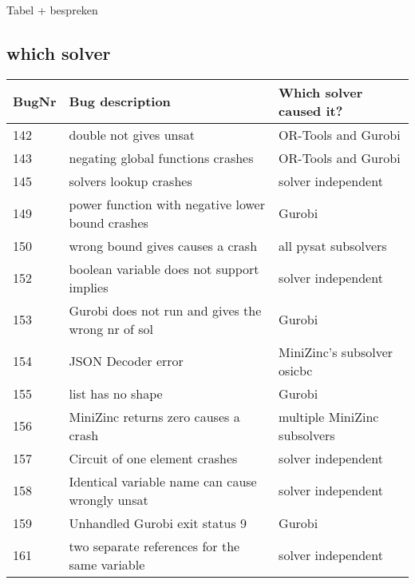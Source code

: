 Tabel + bespreken
\subsection{which solver}
\begin{table}[]
	\centering
	\begin{tabular}{lll}
		BugNr & Bug description                                           & Which solver caused it?\\ \toprule
		142   & double not gives unsat                                    & OR-Tools and Gurobi                            \\
		143   & negating global functions crashes                         & OR-Tools and Gurobi                            \\
		145   & solvers lookup crashes                                    & solver independent                             \\
		149   & power function with negative lower bound crashes          & Gurobi                                         \\
		150   & wrong bound gives causes a crash                          & all pysat subsolvers                           \\
		152   & boolean variable does not support implies                 & solver independent                             \\
		153   & Gurobi does not run and gives the wrong nr of sol         & Gurobi                                         \\
		154   & JSON Decoder error                                        & MiniZinc's subsolver osicbc                    \\
		155   & list has no shape                                         & Gurobi                                         \\
		156   & MiniZinc returns zero causes a crash                      & multiple MiniZinc subsolvers                   \\
		157   & Circuit of one element crashes                            & solver independent                             \\
		158   & Identical variable name can cause wrongly unsat           & solver independent                             \\
		159   & Unhandled Gurobi exit status 9                            & Gurobi                                         \\
		161   & two separate references for the same variable             & solver independent                             \\

\end{tabular}
\end{table}
